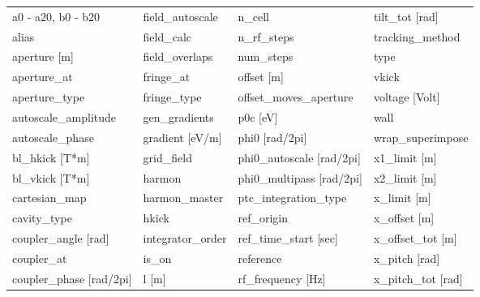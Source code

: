  \begin{tabular}{llll} \toprule
a0 - a20, b0 - b20               & field_autoscale                  & n_cell                           & tilt_tot [rad]                   \\
alias                            & field_calc                       & n_rf_steps                       & tracking_method                  \\
aperture [m]                     & field_overlaps                   & num_steps                        & type                             \\
aperture_at                      & fringe_at                        & offset [m]                       & vkick                            \\
aperture_type                    & fringe_type                      & offset_moves_aperture            & voltage [Volt]                   \\
autoscale_amplitude              & gen_gradients                    & p0c [eV]                         & wall                             \\
autoscale_phase                  & gradient [eV/m]                  & phi0 [rad/2pi]                   & wrap_superimpose                 \\
bl_hkick [T*m]                   & grid_field                       & phi0_autoscale [rad/2pi]         & x1_limit [m]                     \\
bl_vkick [T*m]                   & harmon                           & phi0_multipass [rad/2pi]         & x2_limit [m]                     \\
cartesian_map                    & harmon_master                    & ptc_integration_type             & x_limit [m]                      \\
cavity_type                      & hkick                            & ref_origin                       & x_offset [m]                     \\
coupler_angle [rad]              & integrator_order                 & ref_time_start [sec]             & x_offset_tot [m]                 \\
coupler_at                       & is_on                            & reference                        & x_pitch [rad]                    \\
coupler_phase [rad/2pi]          & l [m]                            & rf_frequency [Hz]                & x_pitch_tot [rad]                \\

\end{tabular}
